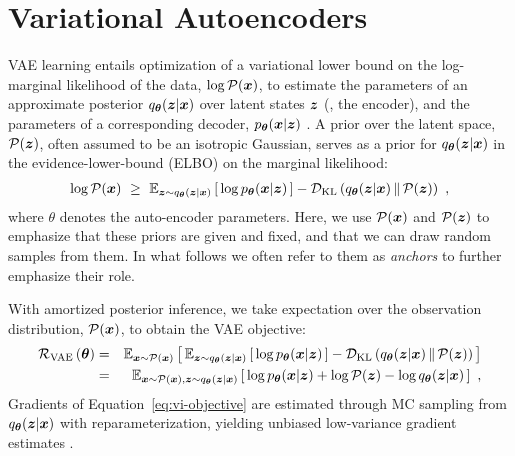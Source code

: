 
\section{Variational Autoencoders}
\label{sec:vae}

VAE learning entails optimization of a variational lower bound on the log-marginal likelihood
of the data, $\log \mathcal{P}({\boldsymbol{x}})$, to estimate the parameters of an approximate posterior
$q_{{\boldsymbol \theta}}({\boldsymbol z}|{\boldsymbol{x}})$ over latent states ${\boldsymbol z}$ (\ie, the encoder), and the parameters
of a corresponding decoder, $p_{{\boldsymbol \theta}}({\boldsymbol{x}}|{\boldsymbol z})$  \citep{Kingma2013,Rezende2014}.
A prior over the latent space, $\mathcal{P}({\boldsymbol z})$, often assumed to be an isotropic
Gaussian, serves as a prior for $q_{{\boldsymbol \theta}}({\boldsymbol z}|{\boldsymbol{x}})$ in the evidence-lower-bound (ELBO)
on the marginal likelihood:
\begin{eqnarray*}
    \log \mathcal{P} ({\boldsymbol{x}}) ~\ge~ 
    \mathbb{E}_{{\boldsymbol z} \sim q_{{\boldsymbol \theta}}({\boldsymbol z}|{\boldsymbol{x}})}\left[\,\log p_{{\boldsymbol \theta}}({\boldsymbol{x}}|{\boldsymbol z})\,\right] - \mathcal{D}_\text{KL}\left(q_{{\boldsymbol \theta}}({\boldsymbol z}|{\boldsymbol{x}})\,\|\, \mathcal{P}({\boldsymbol z})\right) ~ ,
\end{eqnarray*}
where $\theta$ denotes the auto-encoder parameters. Here, we use $\mathcal{P}({\boldsymbol{x}})$
and $\mathcal{P}({\boldsymbol z})$ to emphasize that these priors are given and fixed, and that we can 
draw random samples from them.
In what follows we often refer to them as \textit{anchors}
to further emphasize their role.

With amortized posterior inference, we take expectation over the observation
distribution, $\mathcal{P} ({\boldsymbol{x}})$, to obtain the VAE objective:
\begin{eqnarray}
\VAEelbo \left( \params \right) &=& \E{\x \sim \pjoint (\x)}{\, \E{\z \sim \Menc(\z|\x)}{\,\log \Mdec(\x|\z)\,} - \DKL{\Menc(\z|\x)}{\pjoint(\z)} \,} \nonumber \\
&=& \E{\x \sim \pjoint (\x),\z \sim \Menc(\z|\x)}
{ \, \log \Mdec(\x|\z) + \log \pjoint(\z) - \log \Menc(\z|\x) \,}  ~,
 \label{eq:vi-objective}
\end{eqnarray}
Gradients of Equation\ \eqref{eq:vi-objective} are estimated through MC sampling
from $q_{{\boldsymbol \theta}}({\boldsymbol z}|{\boldsymbol{x}})$ with reparameterization, yielding unbiased low-variance
gradient estimates \citep{Kingma2013,Rezende2014}.

